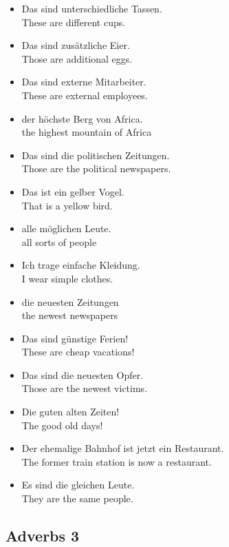 \begin{itemize}
  \item  Das sind unterschiedliche Tassen. \\ These are different cups.
  \item  Das sind zus{\"a}tzliche Eier. \\ Those are additional eggs.
  \item  Das sind externe Mitarbeiter. \\ These are external employees.
  \item  der h{\"o}chste Berg von Africa. \\ the highest mountain of Africa
  \item  Das sind die politischen Zeitungen. \\ Those are the political newspapers.
  \item  Das ist ein gelber Vogel. \\ That is a yellow bird.
  \item  alle m{\"o}glichen Leute. \\ all sorts of people
  \item  Ich trage einfache Kleidung. \\ I wear simple clothes.
  \item  die neuesten Zeitungen \\ the newest newspapers
  \item  Das sind g{\"u}nstige Ferien! \\ These are cheap vacations!
  \item  Das sind die neuesten Opfer. \\ Those are the newest victims.
  \item  Die guten alten Zeiten! \\ The good old days!
  \item  Der ehemalige Bahnhof ist jetzt ein Restaurant. \\ The former train station is now a restaurant.
  \item  Es sind die gleichen Leute. \\ They are the same people.
\end{itemize}


\pagebreak
\subsection{Adverbs 3}

